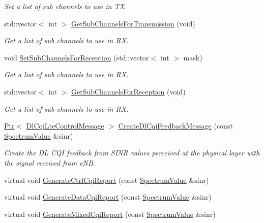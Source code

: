 \begin{DoxyCompactItemize}
\begin{DoxyCompactList}\small\item\em Set a list of sub channels to use in TX. \end{DoxyCompactList}\item 
std\+::vector$<$ int $>$ \hyperlink{classns3_1_1LteUePhy_a95d0fc8fbcd4565ce27bc996cd7d0b6e}{Get\+Sub\+Channels\+For\+Transmission} (void)
\begin{DoxyCompactList}\small\item\em Get a list of sub channels to use in RX. \end{DoxyCompactList}\item 
void \hyperlink{classns3_1_1LteUePhy_abaad47ec4b8f5ea75990a4476261cf81}{Set\+Sub\+Channels\+For\+Reception} (std\+::vector$<$ int $>$ mask)
\begin{DoxyCompactList}\small\item\em Get a list of sub channels to use in RX. \end{DoxyCompactList}\item 
std\+::vector$<$ int $>$ \hyperlink{classns3_1_1LteUePhy_aff148ddb63c68af7ebb0e85e97dfeffb}{Get\+Sub\+Channels\+For\+Reception} (void)
\begin{DoxyCompactList}\small\item\em Get a list of sub channels to use in RX. \end{DoxyCompactList}\item 
\hyperlink{classns3_1_1Ptr}{Ptr}$<$ \hyperlink{classns3_1_1DlCqiLteControlMessage}{Dl\+Cqi\+Lte\+Control\+Message} $>$ \hyperlink{classns3_1_1LteUePhy_aaf8183f2c12925d6aa950a4b826a1242}{Create\+Dl\+Cqi\+Feedback\+Message} (const \hyperlink{classns3_1_1SpectrumValue}{Spectrum\+Value} \&sinr)
\begin{DoxyCompactList}\small\item\em Create the DL C\+QI feedback from S\+I\+NR values perceived at the physical layer with the signal received from e\+NB. \end{DoxyCompactList}\item 
virtual void \hyperlink{classns3_1_1LteUePhy_a7eb062ce376b91b78d2bcfec9119c228}{Generate\+Ctrl\+Cqi\+Report} (const \hyperlink{classns3_1_1SpectrumValue}{Spectrum\+Value} \&sinr)
\item 
virtual void \hyperlink{classns3_1_1LteUePhy_a34be938d16854021543df501e5f340c8}{Generate\+Data\+Cqi\+Report} (const \hyperlink{classns3_1_1SpectrumValue}{Spectrum\+Value} \&sinr)
\item 
virtual void \hyperlink{classns3_1_1LteUePhy_afdd5a3c3b8a0a7bc8996254bd693e0de}{Generate\+Mixed\+Cqi\+Report} (const \hyperlink{classns3_1_1SpectrumValue}{Spectrum\+Value} \&sinr)

\end{DoxyCompactItemize}
